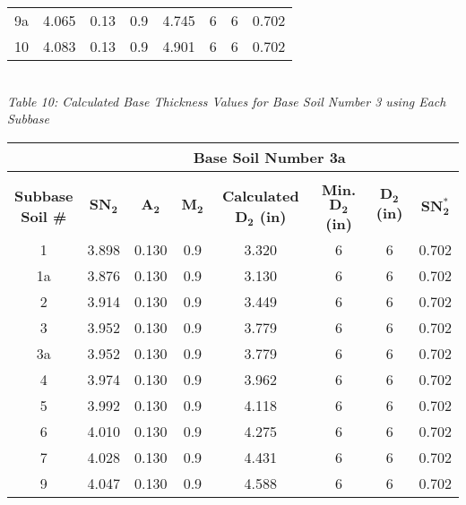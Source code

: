 \documentclass{article}
\begin{document}
\begin{center}
\begin{spacing}{1.6}
\begin{tabular}{|c|ccccccc|}
                                            9a & 4.065 & 0.13 & 0.9 & 4.745 & 6 & 6 & 0.702  \\
                                            10 & 4.083 & 0.13 & 0.9 & 4.901 & 6 & 6 & 0.702\\\hline
        \end{tabular}
        \vspace{3mm}
        \emph{\\Table 10: Calculated Base Thickness Values for Base Soil Number 3 using Each Subbase}
        \newpage
        \begin{tabular}{|c|ccccccc|}
            \hline    
            \multicolumn{1}{|l}{}                     & \multicolumn{7}{c|}{\textbf{Base Soil Number 3a}}                                              \\\hline
            &&&&&&&\\
             \shortstack[c]{\textbf{Subbase}\\\textbf{Soil \#}} & $\bm{SN_2}$ & $\bm{A_2}$ & $\bm{M_2}$ & \textbf{Calculated $\bm{D_2}$ (in)} & \textbf{Min. $\bm{D_2}$ (in)} & \textbf{$\bm{D_2}$ (in)} & $\bm{SN_2^*}$  \\\hline
                                            1  & 3.898 & 0.130 & 0.9 & 3.320 & 6 & 6 & 0.702  \\
                                            1a & 3.876 & 0.130 & 0.9 & 3.130 & 6 & 6 & 0.702  \\
                                            2  & 3.914 & 0.130 & 0.9 & 3.449 & 6 & 6 & 0.702  \\
                                            3  & 3.952 & 0.130 & 0.9 & 3.779 & 6 & 6 & 0.702  \\
                                            3a & 3.952 & 0.130 & 0.9 & 3.779 & 6 & 6 & 0.702  \\
                                            4  & 3.974 & 0.130 & 0.9 & 3.962 & 6 & 6 & 0.702  \\
                                            5  & 3.992 & 0.130 & 0.9 & 4.118 & 6 & 6 & 0.702  \\
                                            6  & 4.010 & 0.130 & 0.9 & 4.275 & 6 & 6 & 0.702  \\
                                            7  & 4.028 & 0.130 & 0.9 & 4.431 & 6 & 6 & 0.702  \\
                                            9  & 4.047 & 0.130 & 0.9 & 4.588 & 6 & 6 & 0.702  \\

\end{tabular}
\end{spacing}
\end{center}
\end{document}
